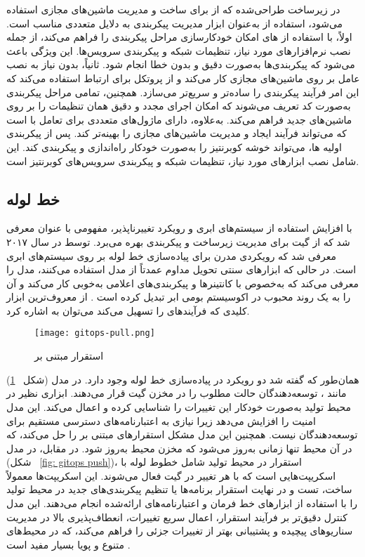 در زیرساخت طراحی‌شده که از  برای ساخت و مدیریت ماشین‌های مجازی استفاده می‌شود، استفاده از  به‌عنوان ابزار مدیریت پیکربندی به دلایل متعددی مناسب است. اولاً،  با استفاده از های  امکان خودکارسازی مراحل پیکربندی را فراهم می‌کند، از جمله نصب نرم‌افزارهای مورد نیاز، تنظیمات شبکه و پیکربندی سرویس‌ها. این ویژگی باعث می‌شود که پیکربندی‌ها به‌صورت دقیق و بدون خطا انجام شود. ثانیاً،  بدون نیاز به نصب عامل بر روی ماشین‌های مجازی کار می‌کند و از پروتکل  برای ارتباط استفاده می‌کند که این امر فرآیند پیکربندی را ساده‌تر و سریع‌تر می‌سازد. همچنین، تمامی مراحل پیکربندی به‌صورت کد تعریف می‌شوند که امکان اجرای مجدد و دقیق همان تنظیمات را بر روی ماشین‌های جدید فراهم می‌کند. به‌علاوه،  دارای ماژول‌های متعددی برای تعامل با  است که می‌تواند فرآیند ایجاد و مدیریت ماشین‌های مجازی را بهینه‌تر کند. پس از پیکربندی اولیه ها،  می‌تواند خوشه کوبرنتیز را به‌صورت خودکار راه‌اندازی و پیکربندی کند. این شامل نصب ابزارهای مورد نیاز، تنظیمات شبکه و پیکربندی سرویس‌های کوبرنتیز است.

\subsection{خط لوله }
با افزایش استفاده از سیستم‌های ابری و رویکرد تغییرناپذیر، مفهومی با عنوان  معرفی شد که از گیت برای مدیریت زیرساخت و پیکربندی بهره می‌برد.  توسط  در سال ۲۰۱۷ معرفی شد که رویکردی مدرن برای پیاده‌سازی خط لوله  بر روی سیستم‌های ابری است. در حالی که ابزارهای سنتی تحویل مداوم عمدتاً از مدل  استفاده می‌کنند،  مدل  را معرفی می‌کند که به‌خصوص با کانتینرها و پیکربندی‌های اعلامی به‌خوبی کار می‌کند و آن را به یک روند محبوب در اکوسیستم بومی ابر تبدیل کرده است \cite{Devopsgitops}. از معروف‌ترین ابزار کلیدی که فرآیندهای  را تسهیل می‌کند می‌توان به  اشاره کرد.

\begin{figure}[t]
	\centering
	\texttt{[image: gitops-pull.png]}
	\caption{استقرار مبتنی بر }
	\label{fig: gitops pull}
\end{figure}

همان‌طور که گفته شد دو رویکرد در پیاده‌سازی خط لوله  وجود دارد. در مدل  
(شکل 
~\ref{fig: gitops pull})
مانند ، توسعه‌دهندگان حالت مطلوب را در مخزن گیت قرار می‌دهند. ابزاری نظیر  در محیط تولید به‌صورت خودکار این تغییرات را شناسایی کرده و اعمال می‌کند. این مدل امنیت را افزایش می‌دهد زیرا نیازی به اعتبارنامه‌های دسترسی مستقیم برای توسعه‌دهندگان نیست. همچنین این مدل مشکل استقرارهای مبتنی بر  را حل می‌کند، که در آن محیط تنها زمانی به‌روز می‌شود که مخزن محیط به‌روز شود.
در مقابل، در مدل  (شکل 
~\ref{fig: gitops push})، استقرار در محیط تولید شامل خطوط لوله  با اسکریپت‌هایی است که با هر تغییر در گیت فعال می‌شوند. این اسکریپت‌ها معمولاً ساخت، تست و در نهایت استقرار برنامه‌ها یا تنظیم پیکربندی‌های جدید در محیط تولید را با استفاده از ابزارهای خط فرمان و اعتبارنامه‌های ارائه‌شده انجام می‌دهند. این مدل کنترل دقیق‌تر بر فرآیند استقرار، اعمال سریع تغییرات، انعطاف‌پذیری بالا در مدیریت سناریوهای پیچیده و پشتیبانی بهتر از تغییرات جزئی را فراهم می‌کند، که در محیط‌های متنوع و پویا بسیار مفید است \cite{Devopsgitops}.

